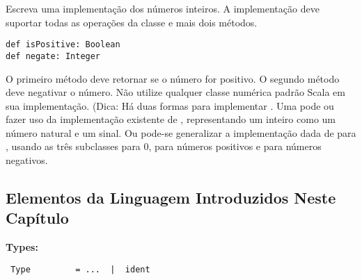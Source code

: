 \begin{exercise}
Escreva uma implementa\c{c}\~{a}o  dos n\'{u}meros inteiros. A implementa\c{c}\~{a}o deve
suportar todas as opera\c{c}\~{o}es da classe  e mais dois m\'{e}todos.

\begin{lstlisting}
def isPositive: Boolean
def negate: Integer
\end{lstlisting}
O primeiro m\'{e}todo deve retornar  se o n\'{u}mero for positivo. O segundo 
m\'{e}todo deve negativar o n\'{u}mero. N\~{a}o utilize qualquer classe num\'{e}rica padr\~{a}o Scala
em sua implementa\c{c}\~{a}o. (Dica: H\'{a} duas formas para implementar . Uma
pode ou fazer uso da implementa\c{c}\~{a}o existente de , representando um inteiro 
como um n\'{u}mero natural e um sinal. Ou pode-se generalizar a implementa\c{c}\~{a}o dada de 
 para , usando as tr\^{e}s subclasses  para 0, 
 para n\'{u}meros positivos e  para n\'{u}meros negativos. 
\end{exercise}

\subsection*{Elementos da Linguagem Introduzidos Neste Cap\'{i}tulo}
 \textbf{Types:}
 \begin{lstlisting}
 Type         = ...  |  ident
 \end{lstlisting}

